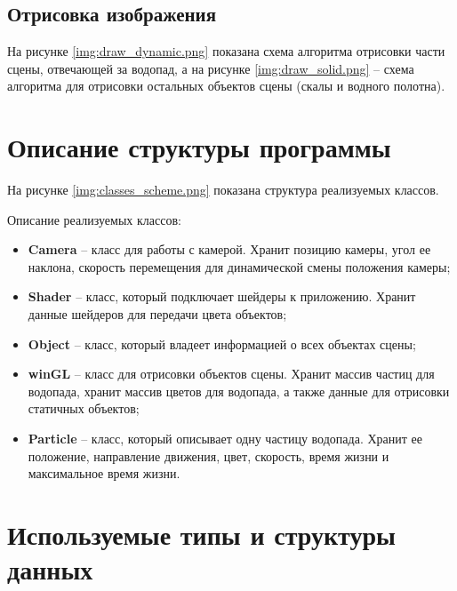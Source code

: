 

\subsection{Отрисовка изображения}

На рисунке \ref{img:draw_dynamic.png} показана схема алгоритма отрисовки части сцены, отвечающей за водопад, а на рисунке \ref{img:draw_solid.png} -- схема алгоритма для отрисовки остальных объектов сцены (скалы и водного полотна).


\clearpage


\section{Описание структуры программы}

На рисунке \ref{img:classes_scheme.png} показана структура реализуемых классов.


\clearpage

Описание реализуемых классов:

\begin{itemize}
    \item \textbf{Camera} -- класс для работы с камерой. Хранит позицию камеры, угол ее наклона, скорость перемещения для динамической смены положения камеры;
    \item \textbf{Shader} -- класс, который подключает шейдеры к приложению. Хранит данные шейдеров для передачи цвета объектов;
    \item \textbf{Object} -- класс, который владеет информацией о всех объектах сцены;
    \item \textbf{winGL} -- класс для отрисовки объектов сцены. Хранит массив частиц для водопада, хранит массив цветов для водопада, а также данные для отрисовки статичных объектов;
    \item \textbf{Particle} -- класс, который описывает одну частицу водопада. Хранит ее положение, направление движения, цвет, скорость, время жизни и максимальное время жизни. 
\end{itemize}


\section{Используемые типы и структуры данных}

